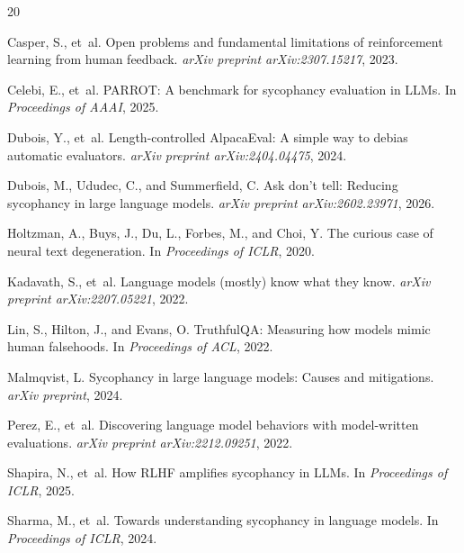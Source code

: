 \documentclass{article}
\begin{document}
\begin{thebibliography}{20}

Casper, S., et~al.
\newblock Open problems and fundamental limitations of reinforcement learning from human feedback.
\newblock \emph{arXiv preprint arXiv:2307.15217}, 2023.

Celebi, E., et~al.
\newblock PARROT: A benchmark for sycophancy evaluation in LLMs.
\newblock In \emph{Proceedings of AAAI}, 2025.

Dubois, Y., et~al.
\newblock Length-controlled AlpacaEval: A simple way to debias automatic evaluators.
\newblock \emph{arXiv preprint arXiv:2404.04475}, 2024.

Dubois, M., Ududec, C., and Summerfield, C.
\newblock Ask don't tell: Reducing sycophancy in large language models.
\newblock \emph{arXiv preprint arXiv:2602.23971}, 2026.

Holtzman, A., Buys, J., Du, L., Forbes, M., and Choi, Y.
\newblock The curious case of neural text degeneration.
\newblock In \emph{Proceedings of ICLR}, 2020.

Kadavath, S., et~al.
\newblock Language models (mostly) know what they know.
\newblock \emph{arXiv preprint arXiv:2207.05221}, 2022.

Lin, S., Hilton, J., and Evans, O.
\newblock TruthfulQA: Measuring how models mimic human falsehoods.
\newblock In \emph{Proceedings of ACL}, 2022.

Malmqvist, L.
\newblock Sycophancy in large language models: Causes and mitigations.
\newblock \emph{arXiv preprint}, 2024.

Perez, E., et~al.
\newblock Discovering language model behaviors with model-written evaluations.
\newblock \emph{arXiv preprint arXiv:2212.09251}, 2022.

Shapira, N., et~al.
\newblock How RLHF amplifies sycophancy in LLMs.
\newblock In \emph{Proceedings of ICLR}, 2025.

Sharma, M., et~al.
\newblock Towards understanding sycophancy in language models.
\newblock In \emph{Proceedings of ICLR}, 2024.


\end{thebibliography}
\end{document}
